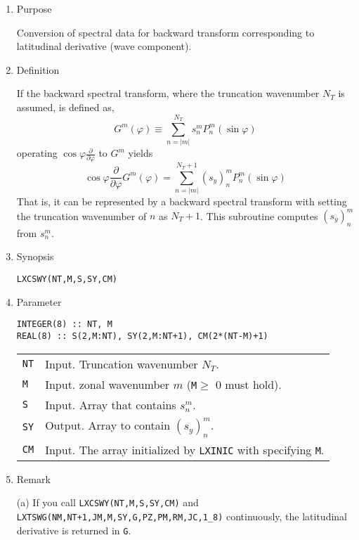 \documentclass[a4paper]{scrartcl}
\begin{document}
\begin{enumerate}

\item Purpose 

Conversion of spectral data for backward transform
corresponding to latitudinal derivative (wave component).

\item Definition

If the backward spectral transform, where the 
truncation wavenumber $N_T$ is assumed, is defined as,
\begin{equation}
G^m(\varphi)\equiv\sum^{N_T}_{n=|m|}s^m_nP^m_n(\sin\varphi)
\end{equation}
operating $\cos\varphi\frac{\partial}{\partial\varphi}$ to
$G^m$ yields
\begin{equation}
\cos\varphi\frac{\partial}{\partial\varphi}
G^m(\varphi)=\sum^{N_T+1}_{n=|m|}
(s_y)^m_nP^m_n(\sin\varphi)
\end{equation}
That is, it can be represented by a backward spectral transform
with setting the truncation wavenumber of $n$ as $N_T+1$.
This subroutine computes $(s_y)^m_n$ from $s^m_n$.

\item Synopsis 
    
\texttt{LXCSWY(NT,M,S,SY,CM)}
  
\item Parameter

\begin{verbatim}
INTEGER(8) :: NT, M
REAL(8) :: S(2,M:NT), SY(2,M:NT+1), CM(2*(NT-M)+1)
\end{verbatim}
      
\begin{tabular}{ll}
\texttt{NT} & Input. Truncation wavenumber $N_T$.\\
\texttt{M} & Input. zonal wavenumber $m$ 
(\texttt{M}$\ge$ 0 must hold).\\
\texttt{S} & Input. Array that contains $s^m_n$.\\
\texttt{SY} & Output. Array to contain $(s_y)^m_n$.\\
\texttt{CM}  & Input. The array initialized by \texttt{LXINIC}
with specifying \texttt{M}.
\end{tabular}

\item Remark

(a) If you call \texttt{LXCSWY(NT,M,S,SY,CM)} and 
  \texttt{LXTSWG(NM,NT+1,JM,M,SY,G,PZ,PM,RM,JC,1\_8)}
 continuously, the latitudinal derivative is returned in \texttt{G}.  
   
\end{enumerate}
\end{document}
